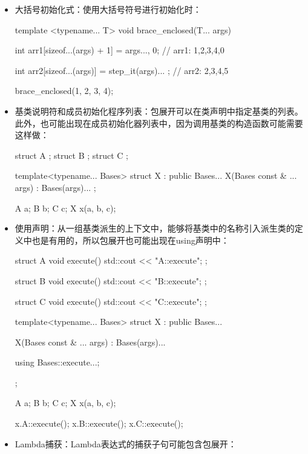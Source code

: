 \begin{itemize}
\begin{cppcode}
{	std::common_type_t<T...> value;
};

template <typename... T>
void parenthesized(T... args)
{
	std::array<std::common_type_t<T...>,
	           sizeof...(T)> arr {args...};
	// std::array<int, 4> {1, 2, 3, 4}
	
	sum_wrapper sw1(args...);
	// value = 1 + 2 + 3 + 4
	
	sum_wrapper sw2(++args...);
	// value = 2 + 3 + 4 + 5
}
parenthesized(1, 2, 3, 4);
\end{cppcode}
  \item 大括号初始化式：使用大括号符号进行初始化时：

\begin{cppcode}
template <typename... T>
void brace_enclosed(T... args)
{
	int arr1[sizeof...(args) + 1] = {args..., 0};
	// arr1: {1,2,3,4,0}
	
	int arr2[sizeof...(args)] = { step_it(args)... };
	// arr2: {2,3,4,5}
}

brace_enclosed(1, 2, 3, 4);
\end{cppcode}
  \item 基类说明符和成员初始化程序列表：包展开可以在类声明中指定基类的列表。此外，也可能出现在成员初始化器列表中，因为调用基类的构造函数可能需要这样做：

\begin{cppcode}
struct A {};
struct B {};
struct C {};

template<typename... Bases>
struct X : public Bases...
{
	X(Bases const & ... args) : Bases(args)...
	{ }
};

A a;
B b;
C c;
X x(a, b, c);
\end{cppcode}
  \item 使用声明：从一组基类派生的上下文中，能够将基类中的名称引入派生类的定义中也是有用的，所以包展开也可能出现在using声明中：

\begin{cppcode}
struct A
{
	void execute() { std::cout << "A::execute\n"; }
};

struct B
{
	void execute() { std::cout << "B::execute\n"; }
};

struct C
{
	void execute() { std::cout << "C::execute\n"; }
};

template<typename... Bases>
struct X : public Bases...
{
	X(Bases const & ... args) : Bases(args)...
	{}
	
	using Bases::execute...;
};

A a;
B b;
C c;
X x(a, b, c);

x.A::execute();
x.B::execute();
x.C::execute();
\end{cppcode}
  \item Lambda捕获：Lambda表达式的捕获子句可能包含包展开：


\end{itemize}
